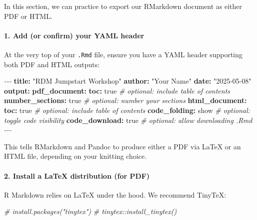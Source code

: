 \documentclass[
]{article}
\newenvironment{Shaded}{\begin{snugshade}}{\end{snugshade}}
\newcommand{\AttributeTok}[1]{\textcolor[rgb]{0.13,0.29,0.53}{#1}}
\newcommand{\CharTok}[1]{\textcolor[rgb]{0.31,0.60,0.02}{#1}}
\newcommand{\CommentTok}[1]{\textcolor[rgb]{0.56,0.35,0.01}{\textit{#1}}}
\newcommand{\FunctionTok}[1]{\textcolor[rgb]{0.13,0.29,0.53}{\textbf{#1}}}
\newcommand{\KeywordTok}[1]{\textcolor[rgb]{0.13,0.29,0.53}{\textbf{#1}}}
\newcommand{\PreprocessorTok}[1]{\textcolor[rgb]{0.56,0.35,0.01}{\textit{#1}}}
\newcommand{\StringTok}[1]{\textcolor[rgb]{0.31,0.60,0.02}{#1}}
\begin{document}
In this section, we can practice to export our RMarkdown document as
either PDF or HTML.

\paragraph{1. Add (or confirm) your YAML
header}\label{add-or-confirm-your-yaml-header}

At the very top of your \texttt{.Rmd} file, ensure you have a YAML
header supporting both PDF and HTML outputs:

\begin{Shaded}
\begin{Highlighting}[]
\PreprocessorTok{{-}{-}{-}}
\FunctionTok{title}\KeywordTok{:}\AttributeTok{ }\StringTok{"RDM Jumpstart Workshop"}
\FunctionTok{author}\KeywordTok{:}\AttributeTok{ }\StringTok{"Your Name"}
\FunctionTok{date}\KeywordTok{:}\AttributeTok{ }\StringTok{"2025{-}05{-}08"}
\FunctionTok{output}\KeywordTok{:}
\AttributeTok{  }\FunctionTok{pdf\_document}\KeywordTok{:}
\AttributeTok{    }\FunctionTok{toc}\KeywordTok{:}\AttributeTok{ }\CharTok{true}\CommentTok{              \# optional: include table of contents}
\AttributeTok{    }\FunctionTok{number\_sections}\KeywordTok{:}\AttributeTok{ }\CharTok{true}\CommentTok{  \# optional: number your sections}
\AttributeTok{  }\FunctionTok{html\_document}\KeywordTok{:}
\AttributeTok{    }\FunctionTok{toc}\KeywordTok{:}\AttributeTok{ }\CharTok{true}\CommentTok{              \# optional: include table of contents}
\AttributeTok{    }\FunctionTok{code\_folding}\KeywordTok{:}\AttributeTok{ show}\CommentTok{     \# optional: toggle code visibility}
\AttributeTok{    }\FunctionTok{code\_download}\KeywordTok{:}\AttributeTok{ }\CharTok{true}\CommentTok{    \# optional: allow downloading .Rmd}
\PreprocessorTok{{-}{-}{-}}
\end{Highlighting}
\end{Shaded}

This tells RMarkdown and Pandoc to produce either a PDF via LaTeX or an
HTML file, depending on your knitting choice.

\paragraph{2. Install a LaTeX distribution (for
PDF)}\label{install-a-latex-distribution-for-pdf}

R Markdown relies on LaTeX under the hood. We recommend TinyTeX:

\begin{Shaded}
\begin{Highlighting}[]
\CommentTok{\# install.packages("tinytex")}
\CommentTok{\# tinytex::install\_tinytex()}
\end{Highlighting}
\end{Shaded}
\end{document}
